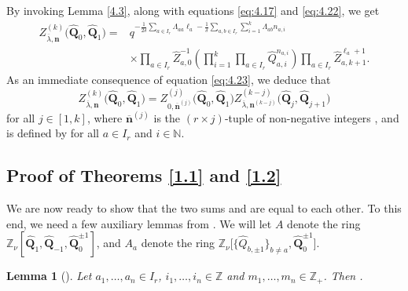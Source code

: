 \documentclass[10pt,a4paper]{amsart}
\numberwithin{equation}{section}
\newtheorem{Lemma}[Theorem]{Lemma}
\begin{document}
By invoking Lemma \ref{4.3}, along with equations \eqref{eq:4.17} and \eqref{eq:4.22}, we get
\begin{align}
Z_{\overline{\lambda},\mathbf{n}}^{(k)}\bigl(\widehat{\mathbf{Q}}_0,\widehat{\mathbf{Q}}_1\bigr)
={}&q^{-\frac{1}{2\delta}\sum_{a\in I_r}\Lambda_{aa}\ell_a-\frac{1}{\delta}\sum_{a,b\in I_r}\sum_{i=1}^k\Lambda_{ab}n_{a,i}}\nonumber\\
&\times\prod_{a\in I_r}\widehat{Z}_{a,0}^{-1}\left(\prod_{i=1}^k\prod_{a\in I_r}\widehat{Q}_{a,i}^{n_{a,i}}\right)\prod_{a\in I_r}\widehat{Z}_{a,k+1}^{\ell_a+1}.\label{eq:4.23}
\end{align}
As an immediate consequence of equation \eqref{eq:4.23}, we deduce that
\begin{equation}\label{eq:4.24}
Z_{\overline{\lambda},\mathbf{n}}^{(k)}\bigl(\widehat{\mathbf{Q}}_0,\widehat{\mathbf{Q}}_1\bigr)
=Z_{0,\overline{\mathbf{n}}^{(j)}}^{(j)}\bigl(\widehat{\mathbf{Q}}_0,\widehat{\mathbf{Q}}_1\bigr)Z_{\overline{\lambda},\mathbf{n}^{(k-j)}}^{(k-j)}
\bigl(\widehat{\mathbf{Q}}_j,\widehat{\mathbf{Q}}_{j+1}\bigr)
\end{equation}
for all $j\in[1,k]$, where $\overline{\mathbf{n}}^{(j)}$ is the $(r\times j)$-tuple of non-negative integers , and  is defined by  for all $a\in I_r$ and $i\in\mathbb{N}$.

\subsection[Proof of Theorems 1.1 and 1.2]{Proof of Theorems \ref{1.1} and \ref{1.2}}\label{Section 4.4}

We are now ready to show that the two sums  and  are equal to each other. To this end, we need a few auxiliary lemmas from \cite[Section 5.5]{DFK14}. We will let $A$ denote the ring~${\mathbb{Z}_{\nu}[\widehat{\mathbf{Q}}_1,\widehat{\mathbf{Q}}_{-1},\widehat{\mathbf{Q}}_0^{\pm1}]}$, and $A_a$ denote the ring $\mathbb{Z}_{\nu}\bigl[\bigl\{\widehat{Q}_{b,\pm1}\bigr\}_{b\neq a},\widehat{\mathbf{Q}}_0^{\pm1}\bigr]$.

\begin{Lemma}[{\cite[Lemma 5.9]{DFK14}}]\label{4.9}
Let $a_1,\dots,a_n\in I_r$, $i_1,\dots,i_n\in\mathbb{Z}$ and $m_1,\dots,m_n\in\mathbb{Z}_+$. Then .
\end{Lemma}
\end{document}
